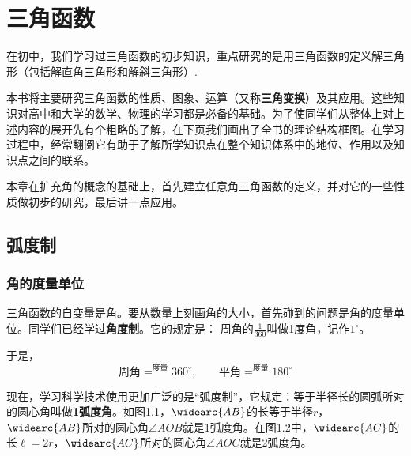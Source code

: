 \chapter{三角函数}
在初中，我们学习过三角函数的初步知识，重点研究的是用三角函数的定义解三角形（包括解直角三角形和解斜三角形）.

本书将主要研究三角函数的性质、图象、运算（又称\textbf{三角变换}）及其应用。这些知识对高中和大学的数学、物理的学习都是必备的基础。为了使同学们从整体上对上述内容的展开先有个粗略的了解，在下页我们画出了全书的理论结构框图。在学习过程中，经常翻阅它有助于了解所学知识点在整个知识体系中的地位、作用以及知识点之间的联系。

本章在扩充角的概念的基础上，首先建立任意角三角函数的定义，并对它的一些性质做初步的研究，最后讲一点应用。

\section{弧度制}
\subsection{角的度量单位}
三角函数的自变量是角。要从数量上刻画角的大小，首先碰到的问题是角的度量单位。同学们已经学过\textbf{角度制}。它的规定是：
周角的$\frac{1}{360}$叫做1度角，记作$1^{\circ}$。

于是，
\begin{equation}
\text{周角}\mathop{=}^{\text{度量}}360^{\circ},\qquad \text{平角}\mathop{=}^{\text{度量}}180^{\circ} \tag{1}
\end{equation}

现在，学习科学技术使用更加广泛的是“弧度制”，它规定：等于半径长的圆弧所对的圆心角叫做\textbf{1弧度角}。如图1.1，$\widearc{AB}$的长等于半径$r$，$\widearc{AB}$所对的圆心角$\angle AOB$就是1弧度角。在图1.2中，$\widearc{AC}$的长$\ell=2r$，$\widearc{AC}$所对的圆心角$\angle AOC$就是2弧度角。

